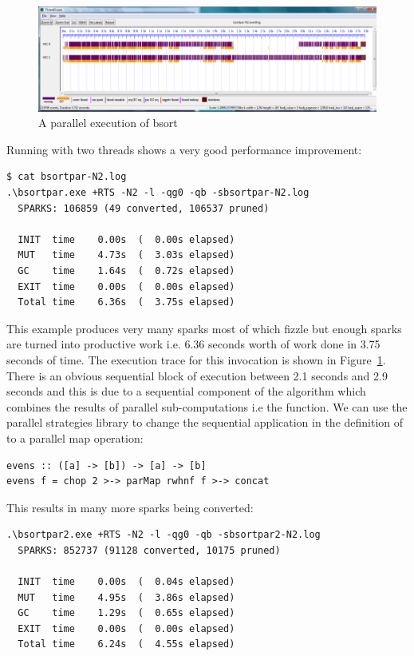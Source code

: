 \begin{figure}
\begin{center}
\includegraphics[width=17cm]{bsortpar-n2.png}
\end{center}
\caption{A parallel execution of bsort}
\label{f:bsortpar-n2}
\end{figure}

 Running with two threads shows a very good performance improvement:

\begin{verbatim}
$ cat bsortpar-N2.log
.\bsortpar.exe +RTS -N2 -l -qg0 -qb -sbsortpar-N2.log
  SPARKS: 106859 (49 converted, 106537 pruned)

  INIT  time    0.00s  (  0.00s elapsed)
  MUT   time    4.73s  (  3.03s elapsed)
  GC    time    1.64s  (  0.72s elapsed)
  EXIT  time    0.00s  (  0.00s elapsed)
  Total time    6.36s  (  3.75s elapsed)
\end{verbatim}

This example produces very many sparks most of which fizzle but enough sparks are turned into productive work i.e. 6.36 seconds worth of work done in 3.75 seconds of time. The execution trace for this invocation is shown in Figure~\ref{f:bsortpar-n2}. 
There is an obvious sequential block of execution between 2.1 seconds and 2.9 seconds and this is due to a sequential component of the algorithm which combines the results of parallel sub-computations i.e the  function. We can use the parallel strategies library to change the sequential application in the definition of  to a parallel map operation:

\begin{lstlisting}
evens :: ([a] -> [b]) -> [a] -> [b]
evens f = chop 2 >-> parMap rwhnf f >-> concat
\end{lstlisting}

This results in many more sparks being converted:

\begin{lstlisting}
.\bsortpar2.exe +RTS -N2 -l -qg0 -qb -sbsortpar2-N2.log
  SPARKS: 852737 (91128 converted, 10175 pruned)

  INIT  time    0.00s  (  0.04s elapsed)
  MUT   time    4.95s  (  3.86s elapsed)
  GC    time    1.29s  (  0.65s elapsed)
  EXIT  time    0.00s  (  0.00s elapsed)
  Total time    6.24s  (  4.55s elapsed)
\end{lstlisting}

